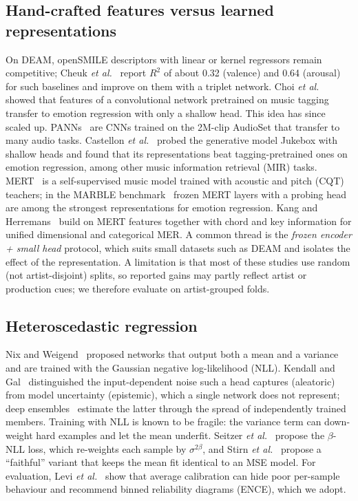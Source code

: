 \subsection{Hand-crafted features versus learned representations}
On DEAM, openSMILE descriptors with linear or kernel regressors remain
competitive; Cheuk \emph{et al.}~\cite{cheuk2020} report $R^2$ of about 0.32
(valence) and 0.64 (arousal) for such baselines and improve on them with a
triplet network. Choi \emph{et al.}~\cite{choi2017} showed that features of a
convolutional network pretrained on music tagging transfer to emotion
regression with only a shallow head. This idea has since scaled up.
PANNs~\cite{kong2020} are CNNs trained on the 2M-clip AudioSet that transfer to
many audio tasks. Castellon \emph{et al.}~\cite{castellon2021} probed the
generative model Jukebox with shallow heads and found that its representations
beat tagging-pretrained ones on emotion regression, among other music
information retrieval (MIR) tasks. MERT~\cite{li2024mert} is a self-supervised
music model trained with acoustic and pitch (CQT) teachers; in the MARBLE
benchmark~\cite{yuan2023marble} frozen MERT layers with a probing head are
among the strongest representations for emotion regression. Kang and
Herremans~\cite{kang2025} build on MERT features together with chord and key
information for unified dimensional and categorical MER. A common thread is
the \emph{frozen encoder + small head} protocol, which suits small datasets such
as DEAM and isolates the effect of the representation. A limitation is that
most of these studies use random (not artist-disjoint) splits, so reported
gains may partly reflect artist or production cues; we therefore evaluate on
artist-grouped folds.

\subsection{Heteroscedastic regression}
Nix and Weigend~\cite{nix1994} proposed networks that output both a mean and a
variance and are trained with the Gaussian negative log-likelihood (NLL).
Kendall and Gal~\cite{kendall2017} distinguished the input-dependent noise such
a head captures (aleatoric) from model uncertainty (epistemic), which a single
network does not represent; deep ensembles~\cite{lakshminarayanan2017} estimate
the latter through the spread of independently trained members. Training with
NLL is known to be fragile: the variance term can down-weight hard examples and
let the mean underfit. Seitzer \emph{et al.}~\cite{seitzer2022} propose the
$\beta$-NLL loss, which re-weights each sample by $\sigma^{2\beta}$, and Stirn
\emph{et al.}~\cite{stirn2023} propose a ``faithful'' variant that keeps the mean
fit identical to an MSE model. For evaluation, Levi \emph{et
al.}~\cite{levi2022} show that average calibration can hide poor per-sample
behaviour and recommend binned reliability diagrams (ENCE), which we adopt.

